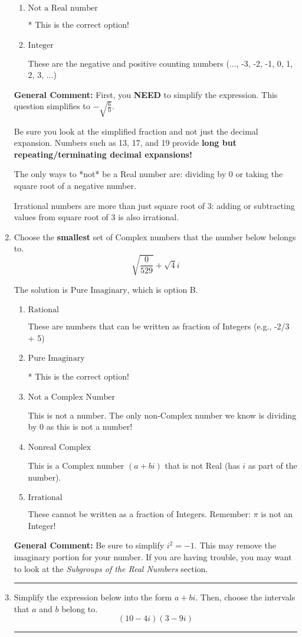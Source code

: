 \documentclass{extbook}[14pt]
\newcommand{\litem}[1]{\item #1

\rule{\textwidth}{0.4pt}}
\begin{document}
\begin{enumerate}
{\begin{enumerate}[label=\Alph*.]
These cannot be written as a fraction of Integers.
\item \( \text{Not a Real number} \)

* This is the correct option!
\item \( \text{Integer} \)

These are the negative and positive counting numbers (..., -3, -2, -1, 0, 1, 2, 3, ...)
\end{enumerate}

\textbf{General Comment:} First, you \textbf{NEED} to simplify the expression. This question simplifies to $-\sqrt{\frac{6}{0}}$. 
 
 Be sure you look at the simplified fraction and not just the decimal expansion. Numbers such as 13, 17, and 19 provide \textbf{long but repeating/terminating decimal expansions!} 
 
 The only ways to *not* be a Real number are: dividing by 0 or taking the square root of a negative number. 
 
 Irrational numbers are more than just square root of 3: adding or subtracting values from square root of 3 is also irrational.
}
\litem{
Choose the \textbf{smallest} set of Complex numbers that the number below belongs to.
\[ \sqrt{\frac{0}{529}}+\sqrt{4}i \]

The solution is \( \text{Pure Imaginary} \), which is option B.\begin{enumerate}[label=\Alph*.]
\item \( \text{Rational} \)

These are numbers that can be written as fraction of Integers (e.g., -2/3 + 5)
\item \( \text{Pure Imaginary} \)

* This is the correct option!
\item \( \text{Not a Complex Number} \)

This is not a number. The only non-Complex number we know is dividing by 0 as this is not a number!
\item \( \text{Nonreal Complex} \)

This is a Complex number $(a+bi)$ that is not Real (has $i$ as part of the number).
\item \( \text{Irrational} \)

These cannot be written as a fraction of Integers. Remember: $\pi$ is not an Integer!
\end{enumerate}

\textbf{General Comment:} Be sure to simplify $i^2 = -1$. This may remove the imaginary portion for your number. If you are having trouble, you may want to look at the \textit{Subgroups of the Real Numbers} section.
}
\litem{
Simplify the expression below into the form $a+bi$. Then, choose the intervals that $a$ and $b$ belong to.
\[ (10 - 4 i)(3 - 9 i) \]

}
\end{enumerate}
\end{document}
